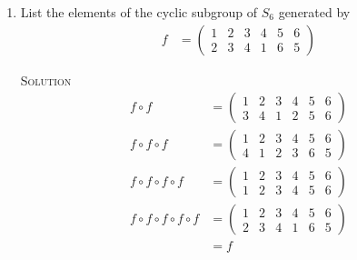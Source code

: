 \documentclass[twoside]{amsart}
\newcommand{\solution}{\textsc{Solution}\xspace}
\begin{document}
\begin{enumerate}[A.]
\begin{enumerate}[1]
      Show that $G$ is a group of permutations, and write its table:

      \solution The neutral element is $\epsilon$. Each element is its
      own inverse:

      \begin{center}
      \begin{tabular}{c|cccc}
         $\circ$ & $\epsilon$ &     $f$    &     $g$    &     $h$    \\ \hline
      $\epsilon$ & $\epsilon$ &     $f$    &     $g$    &     $h$    \\
          $f$    &     $f$    & $\epsilon$ &     $h$    &     $g$    \\
	  $g$    &     $g$    &     $h$    & $\epsilon$ &     $f$    \\
	  $h$    &     $h$    &     $g$    &     $f$    & $\epsilon$ 
      \end{tabular}
      \end{center}

      \item List the elements of the cyclic subgroup of $S_6$ generated by
      \begin{align*}
         f &= \begin{pmatrix}
	         1 & 2 & 3 & 4 & 5 & 6 \\
		 2 & 3 & 4 & 1 & 6 & 5
	      \end{pmatrix}
      \end{align*}

      \solution 
      \begin{align*}
         f \circ f & = \begin{pmatrix}
	                  1 & 2 & 3 & 4 & 5 & 6 \\
			  3 & 4 & 1 & 2 & 5 & 6
	               \end{pmatrix} \\
         f \circ f \circ f & = \begin{pmatrix}
	                          1 & 2 & 3 & 4 & 5 & 6 \\
				  4 & 1 & 2 & 3 & 6 & 5
	                       \end{pmatrix} \\
	 f \circ f \circ f \circ f & =
	               \begin{pmatrix}
		          1 & 2 & 3 & 4 & 5 & 6 \\
			  1 & 2 & 3 & 4 & 5 & 6
		       \end{pmatrix}\\
        f \circ f \circ f \circ f \circ f & =
	               \begin{pmatrix}
		          1 & 2 & 3 & 4 & 5 & 6 \\
			  2 & 3 & 4 & 1 & 6 & 5
		       \end{pmatrix} \\
		       & = f
      \end{align*}


\end{enumerate}
\end{enumerate}
\end{document}
